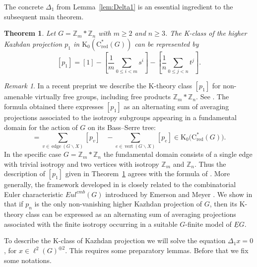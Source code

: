 \documentclass[a4paper,leqno,12pt]{article}
\numberwithin{equation}{section}
\theoremstyle{plain}
\newtheorem{theorem}[theoremcounter]{Theorem}
\theoremstyle{definition}
\theoremstyle{remark}
\newtheorem{remark}[theoremcounter]{Remark}
\newcommand{\Csr}{\mathrm{C}^*_{\text{red}}}
\begin{document}
	\noindent The concrete $\Delta_1$ from Lemma~\ref{lem:Delta1} is an essential ingredient to the subsequent main theorem.
	
	\begin{theorem} \label{thm: Z_n*Z_m}
		Let $G= \mathbb Z_m \ast \mathbb Z_n$ with $m \geq 2$ and $n \geq 3$. The K-class of the higher Kazhdan projection $p_1$ in $\mathrm K_0(\Csr(G))$ can be represented by
		\[
		[p_1] = [1] - \left[\frac{1}{m}
		\sum_{0 \leq i < m}{s^i}\right] - 
		\left[\frac{1}{n}
		\sum_{0 \leq j <n}{t^j}\right].
		\]
	\end{theorem}
	\begin{remark}
        In a recent preprint we describe the K-theory class $[p_1]$
      for non-amenable virtually free groups, including free products $\mathbb Z_m \ast \mathbb Z_n$.
 See \cite[Corollaries 6.3 and 6.5]{pooyarenwang2025}. The formula obtained there expresses $[p_1]$
as an alternating sum of averaging projections associated to the isotropy subgroups appearing in a fundamental domain for the action of $G$ on its Bass–Serre tree:
       \begin{equation*}
        [p_1]=\sum_{v\in \, \mathrm{edge}\ (G \backslash X)}{[p_{v}]}\,\,\,\,\,-\sum_{e\in \, \mathrm{vert}\  (G \backslash X)}{[p_{e}]}\in \mathrm{K_0(C^*_{red}}(G)).     
    \end{equation*}    
 In the specific case  
        $G= \mathbb Z_m \ast \mathbb Z_n$ the fundamental domain consists of a single edge with trivial isotropy and two vertices with isotropy 
        $\mathbb Z_m$ and $\mathbb Z_n$. Thus the description of $[p_1]$ given in Theorem~\ref{thm: Z_n*Z_m} agrees with the formula of \cite[Corollary 6.5]{pooyarenwang2025}. 
        More generally, the framework developed in \cite{pooyarenwang2025} is closely related to the combinatorial Euler characteristic 
$Eul^{cmb}(G)$
 introduced by Emerson and Meyer \cite{EM}. We show in \cite[Theorem 4.1]{pooyarenwang2025} that if $p_n$
 is the only non-vanishing higher Kazhdan projection of $G$, then its K-theory class can be expressed as an alternating sum of averaging projections associated with the finite isotropy occurring in a suitable
$G$-finite model of $\underline EG$.   
\end{remark}
    
	To describe the K-class of Kazhdan projection we will solve the equation $\Delta_1x=0$, for $x\in \ell^2 (G)^{\oplus 2}$. This requires some preparatory lemmas. Before that we fix some notations.
	
\end{document}
